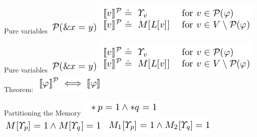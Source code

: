 \documentclass{beamer}
\begin{document}
\begin{frame}{Pure variables}
\includegraphics[scale=0.5]{pure1.png}\newline
\includegraphics[scale=0.5]{pure2.png}\newline
\end{frame}

\begin{frame}{Pure variables}
\includegraphics[scale=0.5]{pure1.png}\newline
\includegraphics[scale=0.5]{pure2.png}\newline
Theorem:\newline
\includegraphics[scale=0.5]{theorem.png}\newline
\end{frame}

\begin{frame}{Partitioning the Memory}
\includegraphics[scale=0.5]{partitioning1.png}\newline
\includegraphics[scale=0.5]{partitioning2.png}\newline
\includegraphics[scale=0.5]{partitioning3.png}\newline
\end{frame}
\end{document}
